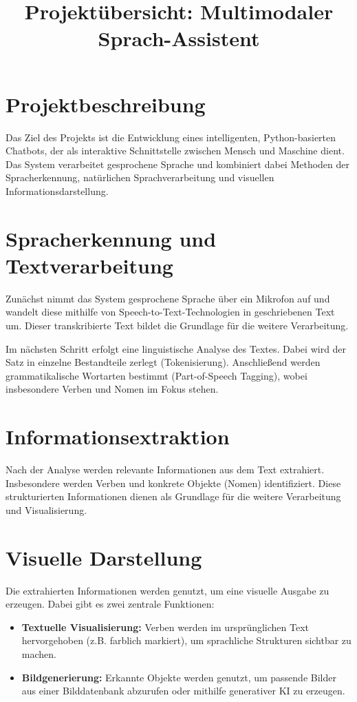 \documentclass[a4paper,12pt]{article}
\begin{document}
\title{Projektübersicht: Multimodaler Sprach-Assistent}
\author{}
\date{}
\maketitle

\section{Projektbeschreibung}

Das Ziel des Projekts ist die Entwicklung eines intelligenten, Python-basierten Chatbots, der als interaktive Schnittstelle zwischen Mensch und Maschine dient. Das System verarbeitet gesprochene Sprache und kombiniert dabei Methoden der Spracherkennung, natürlichen Sprachverarbeitung und visuellen Informationsdarstellung.

\section{Spracherkennung und Textverarbeitung}

Zunächst nimmt das System gesprochene Sprache über ein Mikrofon auf und wandelt diese mithilfe von Speech-to-Text-Technologien in geschriebenen Text um. Dieser transkribierte Text bildet die Grundlage für die weitere Verarbeitung.

Im nächsten Schritt erfolgt eine linguistische Analyse des Textes. Dabei wird der Satz in einzelne Bestandteile zerlegt (Tokenisierung). Anschließend werden grammatikalische Wortarten bestimmt (Part-of-Speech Tagging), wobei insbesondere Verben und Nomen im Fokus stehen.

\section{Informationsextraktion}

Nach der Analyse werden relevante Informationen aus dem Text extrahiert. Insbesondere werden Verben und konkrete Objekte (Nomen) identifiziert. Diese strukturierten Informationen dienen als Grundlage für die weitere Verarbeitung und Visualisierung.

\section{Visuelle Darstellung}

Die extrahierten Informationen werden genutzt, um eine visuelle Ausgabe zu erzeugen. Dabei gibt es zwei zentrale Funktionen:
\begin{itemize}
    \item \textbf{Textuelle Visualisierung:} Verben werden im ursprünglichen Text hervorgehoben (z.B. farblich markiert), um sprachliche Strukturen sichtbar zu machen.
    \item \textbf{Bildgenerierung:} Erkannte Objekte werden genutzt, um passende Bilder aus einer Bilddatenbank abzurufen oder mithilfe generativer KI zu erzeugen.
\end{itemize}
\end{document}
